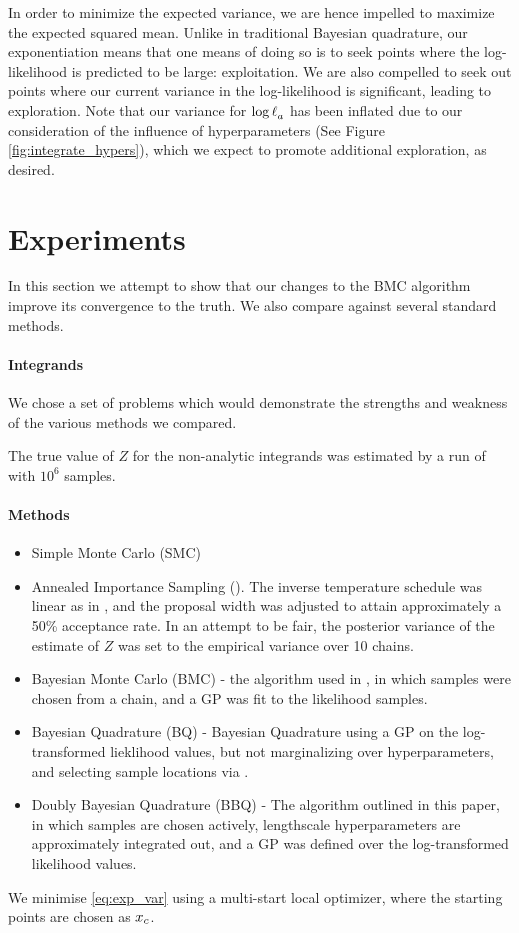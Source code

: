 \documentclass{article}
\begin{document}
In order to minimize the expected variance, we are hence impelled to maximize the expected squared mean. Unlike in traditional Bayesian quadrature, our exponentiation means that one means of doing so is to seek points where the log-likelihood is predicted to be large: exploitation. We are also compelled to seek out points where our current variance in the log-likelihood is significant, leading to exploration. Note that our variance for $\tr_a$ has been inflated due to our consideration of the influence of hyperparameters (See Figure \ref{fig:integrate_hypers}), which we expect to promote additional exploration, as desired.




\section{Experiments}
\label{sec:experiments}
In this section we attempt to show that our changes to the BMC algorithm improve its convergence to the truth.  We also compare against several standard  methods.
\paragraph{Integrands}
We chose a set of problems which would demonstrate the strengths and weakness of the various methods we compared.

The true value of $Z$ for the non-analytic integrands was estimated by a run of  with $10^6$ samples.
\paragraph{Methods}
\begin{itemize}
\item Simple Monte Carlo (SMC)
\item Annealed Importance Sampling ().  The inverse temperature schedule was linear as in \citep{BZMonteCarlo}, and the proposal width was adjusted to attain approximately a 50\% acceptance rate.  In an attempt to be fair, the posterior variance of the  estimate of $Z$ was set to the empirical variance over 10 chains.
\item Bayesian Monte Carlo (BMC) - the algorithm used in \citep{BZMonteCarlo}, in which samples were chosen from a  chain, and a GP was fit to the likelihood samples.
\item Bayesian Quadrature (BQ) - Bayesian Quadrature using a GP on the log-transformed lieklihood values, but not marginalizing over hyperparameters, and selecting sample locations via .
\item Doubly Bayesian Quadrature (BBQ) - The algorithm outlined in this paper, in which samples are chosen actively, lengthscale hyperparameters are approximately integrated out, and a GP was defined over the log-transformed likelihood values.
\end{itemize}
We minimise \eqref{eq:exp_var} using a multi-start local optimizer, where the starting points are chosen as $\lfv_c$. 
\end{document}
